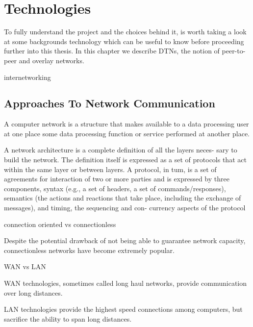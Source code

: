 
\chapter{Technologies}\label{chapter:technologies}


	
	
	To fully understand the project and the choices behind it, is worth taking a look at some backgrounds technology which can be useful to know before proceeding further into this thesis.
	In this chapter we describe DTNs, the notion of peer-to-peer and overlay networks.
	
	internetworking \cite{internetworking}
	
	
\section{Approaches To Network Communication}
	
	A  computer  network  is a  structure  that  makes  available  to  a  data 
	processing  user at  one  place  some data  processing  function or  service 
	performed at another place.
	
	A  network architecture is  a  complete definition  of all  the layers  neces-
	sary  to  build  the  network.  The  definition  itself  is expressed  as a  set  of 
	protocols  that  act  within  the  same  layer  or  between  layers.  A  protocol,  in 
	tum,  is  a  set  of  agreements  for  interaction  of two  or  more  parties  and  is 
	expressed  by  three  components,  syntax  (e.g., a  set  of  headers, a set  of 
	commands/responses), semantics (the actions  and reactions that take place, 
	including  the  exchange  of  messages),  and  timing,  the  sequencing  and  con-
	currency aspects  of the  protocol
	
	connection oriented vs connectionless
	
	Despite the potential drawback of not being able to guarantee network capacity,
	connectionless networks have become extremely popular.
	
	WAN vs LAN
	
	WAN technologies, sometimes called long haul networks, provide communication
	over long distances.
	
	LAN technologies provide the highest speed connections among computers, but
	sacrifice the ability to span long distances.
	
